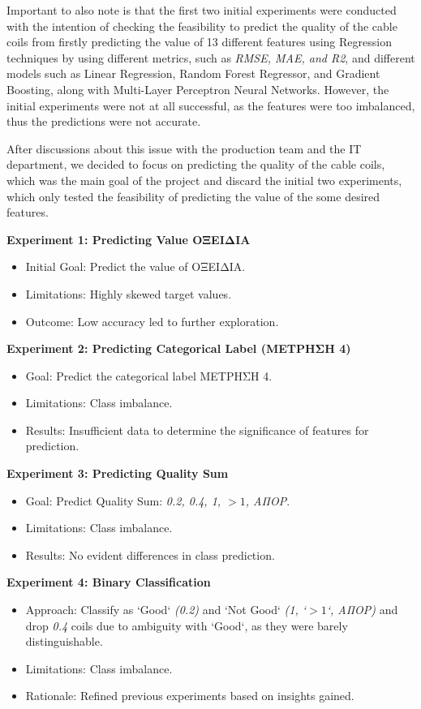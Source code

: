 Important to also note is that the first two initial experiments were conducted
with the intention of checking the feasibility to predict the quality of the
cable coils from firstly predicting the value of 13 different features using
Regression techniques by using different metrics, such as \emph{RMSE, MAE, and
    R2}, and different models such as Linear Regression, Random Forest Regressor,
and Gradient Boosting, along with Multi-Layer Perceptron Neural Networks.
However, the initial experiments were not at all successful, as the features
were too imbalanced, thus the predictions were not accurate.

After discussions about this issue with the production team and the IT
department, we decided to focus on predicting the quality of the cable coils,
which was the main goal of the project and discard the initial two experiments,
which only tested the feasibility of predicting the value of the some desired
features.

\textbf{Experiment 1: Predicting Value ΟΞΕΙΔΙΑ}
\begin{itemize}
    \item Initial Goal: Predict the value of ΟΞΕΙΔΙΑ.
    \item Limitations: Highly skewed target values.
    \item Outcome: Low accuracy led to further exploration.
\end{itemize}

\textbf{Experiment 2: Predicting Categorical Label (ΜΕΤΡΗΣΗ 4)}
\begin{itemize}
    \item Goal: Predict the categorical label ΜΕΤΡΗΣΗ 4.
    \item Limitations: Class imbalance.
    \item Results: Insufficient data to determine the significance of features for
          prediction.
\end{itemize}

\textbf{Experiment 3: Predicting Quality Sum}
\begin{itemize}
    \item Goal: Predict Quality Sum: \emph{0.2, 0.4, 1, $>1$, ΑΠΟΡ}.
    \item Limitations: Class imbalance.
    \item Results: No evident differences in class prediction.
\end{itemize}

\textbf{Experiment 4: Binary Classification}
\begin{itemize}
    \item Approach: Classify as `Good` \emph{(0.2)} and `Not Good` \emph{(1, `$>1$`,
              ΑΠΟΡ)} and drop \emph{0.4} coils due to ambiguity with `Good`, as they were
          barely distinguishable.
    \item Limitations: Class imbalance.
    \item Rationale: Refined previous experiments based on insights gained.
\end{itemize}

